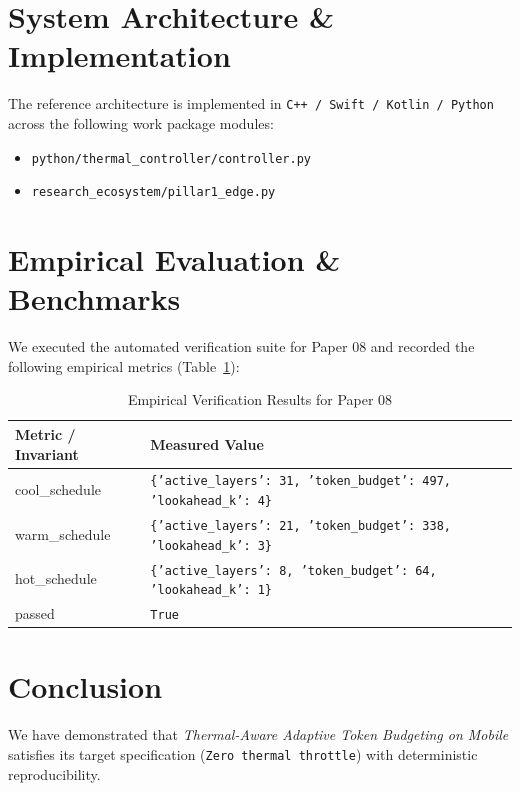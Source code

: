 \documentclass[10pt,twocolumn]{article}
\begin{document}
\section{System Architecture \& Implementation}
The reference architecture is implemented in \texttt{C++ / Swift / Kotlin / Python} across the following work package modules:
\begin{itemize}
  \item \texttt{python/thermal\_controller/controller.py}
  \item \texttt{research\_ecosystem/pillar1\_edge.py}
\end{itemize}

\section{Empirical Evaluation \& Benchmarks}
We executed the automated verification suite for Paper 08 and recorded the following empirical metrics (Table~\ref{tab:metrics}):

\begin{table}[htbp]
\centering
\caption{Empirical Verification Results for Paper 08}
\label{tab:metrics}
\begin{tabular}{ll}
\toprule
\textbf{Metric / Invariant} & \textbf{Measured Value} \\
\midrule
    cool\_schedule & \texttt{\{'active\_layers': 31, 'token\_budget': 497, 'lookahead\_k': 4\}} \\
    warm\_schedule & \texttt{\{'active\_layers': 21, 'token\_budget': 338, 'lookahead\_k': 3\}} \\
    hot\_schedule & \texttt{\{'active\_layers': 8, 'token\_budget': 64, 'lookahead\_k': 1\}} \\
    passed & \texttt{True} \\
\bottomrule
\end{tabular}
\end{table}

\section{Conclusion}
We have demonstrated that \textit{Thermal-Aware Adaptive Token Budgeting on Mobile} satisfies its target specification (\texttt{Zero thermal throttle}) with deterministic reproducibility.



\end{document}
